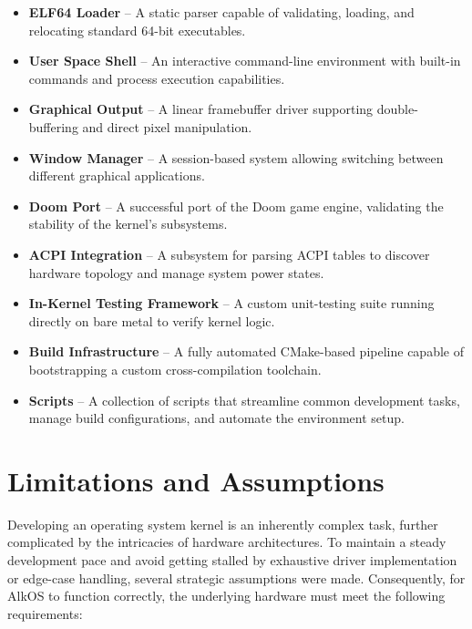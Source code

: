 \documentclass[a4paper,10pt,twoside]{report}
\theoremstyle{definition}
\begin{document}
\begin{itemize}
    \item \textbf{ELF64 Loader} -- A static parser capable of validating, loading, and relocating standard 64-bit executables.
    \item \textbf{User Space Shell} -- An interactive command-line environment with built-in commands and process execution capabilities.
    \item \textbf{Graphical Output} -- A linear framebuffer driver supporting double-buffering and direct pixel manipulation.
    \item \textbf{Window Manager} -- A session-based system allowing switching between different graphical applications.
    \item \textbf{Doom Port} -- A successful port of the Doom game engine, validating the stability of the kernel's subsystems.
    \item \textbf{ACPI Integration} -- A subsystem for parsing ACPI tables to discover hardware topology and manage system power states.
    \item \textbf{In-Kernel Testing Framework} -- A custom unit-testing suite running directly on bare metal to verify kernel logic.
    \item \textbf{Build Infrastructure} -- A fully automated CMake-based pipeline capable of bootstrapping a custom cross-compilation toolchain.
    \item \textbf{Scripts} -- A collection of scripts that streamline common development tasks, manage build configurations, and automate the environment setup.
\end{itemize}

\section{Limitations and Assumptions}

Developing an operating system kernel is an inherently complex task, further complicated by the intricacies of hardware architectures. To maintain a steady development pace and avoid getting stalled by exhaustive driver implementation or edge-case handling, several strategic assumptions were made. Consequently, for AlkOS to function correctly, the underlying hardware must meet the following requirements:
\end{document}
